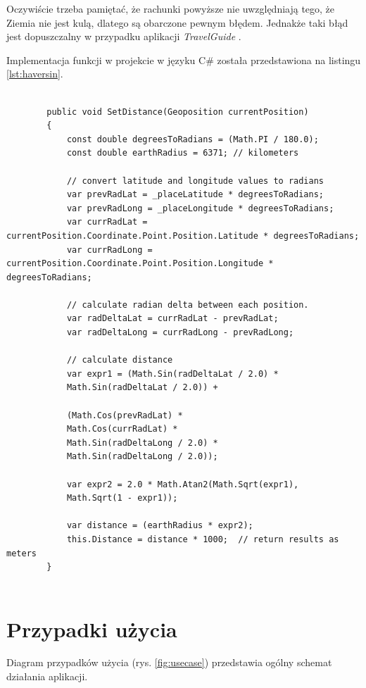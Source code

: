 \documentclass[a4paper]{book}
\newcommand{\appName}{\emph{TravelGuide} }
\begin{document}
			Oczywiście trzeba pamiętać, że rachunki powyższe nie uwzględniają tego, że Ziemia nie jest kulą, dlatego są obarczone pewnym błędem. Jednakże taki błąd jest dopuszczalny w przypadku aplikacji \appName.
			
		
		Implementacja funkcji w projekcie w języku C\# została przedstawiona na listingu \ref{lst:haversin}.
		
		\begin{lstlisting}[label={lst:haversin},caption=Funkcja obliczająca dystans pomiędzy pozycją użytkownika a punktem na mapie]
		
		public void SetDistance(Geoposition currentPosition)
		{
			const double degreesToRadians = (Math.PI / 180.0);
			const double earthRadius = 6371; // kilometers
			
			// convert latitude and longitude values to radians
			var prevRadLat = _placeLatitude * degreesToRadians;
			var prevRadLong = _placeLongitude * degreesToRadians;
			var currRadLat = currentPosition.Coordinate.Point.Position.Latitude * degreesToRadians;
			var currRadLong = currentPosition.Coordinate.Point.Position.Longitude * degreesToRadians;
			
			// calculate radian delta between each position.
			var radDeltaLat = currRadLat - prevRadLat;
			var radDeltaLong = currRadLong - prevRadLong;
			
			// calculate distance
			var expr1 = (Math.Sin(radDeltaLat / 2.0) *
			Math.Sin(radDeltaLat / 2.0)) +
			
			(Math.Cos(prevRadLat) *
			Math.Cos(currRadLat) *
			Math.Sin(radDeltaLong / 2.0) *
			Math.Sin(radDeltaLong / 2.0));
			
			var expr2 = 2.0 * Math.Atan2(Math.Sqrt(expr1),
			Math.Sqrt(1 - expr1));
			
			var distance = (earthRadius * expr2);
			this.Distance = distance * 1000;  // return results as meters
		}
		
		\end{lstlisting}


		\section{Przypadki użycia}
		
		Diagram przypadków użycia (rys. \ref{fig:usecase}) przedstawia ogólny schemat działania aplikacji.
		
\end{document}
